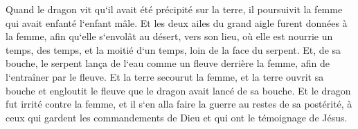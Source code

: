 \verse Quand le dragon vit qu`il avait été précipité sur la terre, il poursuivit la femme qui avait enfanté l`enfant mâle. 
\verse Et les deux ailes du grand aigle furent données à la femme, afin qu`elle s`envolât au désert, vers son lieu, où elle est nourrie un temps, des temps, et la moitié d`un temps, loin de la face du serpent. 
\verse Et, de sa bouche, le serpent lança de l`eau comme un fleuve derrière la femme, afin de l`entraîner par le fleuve. 
\verse Et la terre secourut la femme, et la terre ouvrit sa bouche et engloutit le fleuve que le dragon avait lancé de sa bouche. 
\verse Et le dragon fut irrité contre la femme, et il s`en alla faire la guerre au restes de sa postérité, à ceux qui gardent les commandements de Dieu et qui ont le témoignage de Jésus. 

